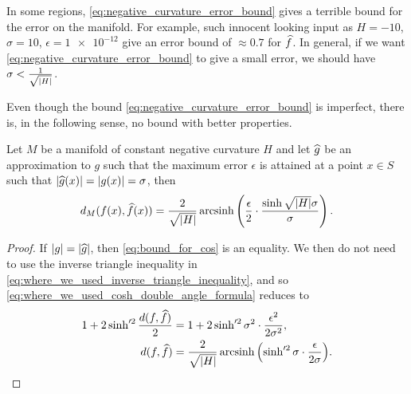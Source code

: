 \documentclass[english, a4paper, 12pt]{article}
\begin{document}
In some regions, \cref{eq:negative_curvature_error_bound} gives a terrible bound for the error on the manifold.
For example, such innocent looking input as $H = -10$, $\sigma = 10$, $\epsilon = \num{1e-12}$ give an error bound of $\approx 0.7$ for $\widehat{f}$.
In general, if we want \cref{eq:negative_curvature_error_bound} to give a small error, we should have $\sigma < \frac{1}{\sqrt{\abs{H}}}$.

Even though the bound \cref{eq:negative_curvature_error_bound} is imperfect, there is, in the following sense, no bound with better properties.
\begin{proposition}
Let $M$ be a manifold of constant negative curvature $H$ and let $\widehat{g}$ be an approximation to $g$ such that the maximum error $\epsilon$ is attained at a point $x \in S$ such that $\abs{\widehat{g}(x)} = \abs{g(x)} = \sigma$, then
	\begin{align}
		d_M(f(x), \widehat{f}(x)) =
			\frac{2}{\sqrt{\abs{H}}}
			\operatorname{arcsinh}\left(
				\frac{\epsilon}{2} \cdot \frac{\sinh{\sqrt{\abs{H}} \sigma}}{\sigma}
				\right).
	\end{align}
\end{proposition}

\begin{proof}
	If $\abs{g} = \abs{\widehat{g}}$, then \cref{eq:bound_for_cos} is an equality.
	We then do not need to use the inverse triangle inequality in \cref{eq:where_we_used_inverse_triangle_inequality}, and so \cref{eq:where_we_used_cosh_double_angle_formula} reduces to
	\begin{align}
		1 + 2 \sinh'^2{\frac{d(f, \widehat{f})}{2}} ={}& 1 + 2 \sinh'^2{\sigma^2} \cdot \frac{\epsilon^2}{2 \sigma^2},\\
		d(f, \widehat{f}) ={}& \frac{2}{\sqrt{\abs{H}}} \operatorname{arcsinh}{ \left(
			\sinh'^2{\sigma} \cdot \frac{\epsilon}{2 \sigma}
			\right) }.
	\end{align}
	
\end{proof}
\end{document}
